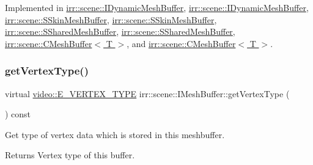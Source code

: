 Implemented in \hyperlink{classirr_1_1scene_1_1IDynamicMeshBuffer_afc317a8ccda7e7eceb1f4955c90848d2}{irr\+::scene\+::\+I\+Dynamic\+Mesh\+Buffer}, \hyperlink{classirr_1_1scene_1_1IDynamicMeshBuffer_afc317a8ccda7e7eceb1f4955c90848d2}{irr\+::scene\+::\+I\+Dynamic\+Mesh\+Buffer}, \hyperlink{structirr_1_1scene_1_1SSkinMeshBuffer_a0420d14f4a4317192aa3423c0634d8d8}{irr\+::scene\+::\+S\+Skin\+Mesh\+Buffer}, \hyperlink{structirr_1_1scene_1_1SSkinMeshBuffer_a0420d14f4a4317192aa3423c0634d8d8}{irr\+::scene\+::\+S\+Skin\+Mesh\+Buffer}, \hyperlink{structirr_1_1scene_1_1SSharedMeshBuffer_aa50aed87725f3cc745b0f04f0233107b}{irr\+::scene\+::\+S\+Shared\+Mesh\+Buffer}, \hyperlink{structirr_1_1scene_1_1SSharedMeshBuffer_aa50aed87725f3cc745b0f04f0233107b}{irr\+::scene\+::\+S\+Shared\+Mesh\+Buffer}, \hyperlink{classirr_1_1scene_1_1CMeshBuffer_a72ee778498eff327a20c6be179976994}{irr\+::scene\+::\+C\+Mesh\+Buffer$<$ T $>$}, and \hyperlink{classirr_1_1scene_1_1CMeshBuffer_a72ee778498eff327a20c6be179976994}{irr\+::scene\+::\+C\+Mesh\+Buffer$<$ T $>$}.

\mbox{\label{classirr_1_1scene_1_1IMeshBuffer_a4d7a84ae4416487736f0ed0f519bb4f0}} 
\subsubsection{\texorpdfstring{get\+Vertex\+Type()}{getVertexType()}\hspace{0.1cm}{\footnotesize\ttfamily [1/2]}}
{\footnotesize\ttfamily virtual \hyperlink{namespaceirr_1_1video_a0e3b59e025e0d0db0ed2ee0ce904deac}{video\+::\+E\+\_\+\+V\+E\+R\+T\+E\+X\+\_\+\+T\+Y\+PE} irr\+::scene\+::\+I\+Mesh\+Buffer\+::get\+Vertex\+Type (\begin{DoxyParamCaption}{ }\end{DoxyParamCaption}) const\hspace{0.3cm}{\ttfamily [pure virtual]}}



Get type of vertex data which is stored in this meshbuffer. 

\begin{DoxyReturn}{Returns}
Vertex type of this buffer. 
\end{DoxyReturn}


